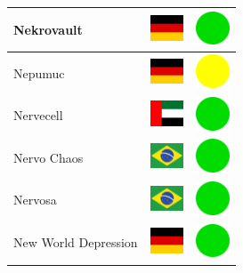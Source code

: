 \documentclass[12pt, a4paper, twoside]{report}
\begin{document}
\begin{center}
\begin{longtable}{|p{5cm}|p{2cm}|p{2cm}|}
 Nekrovault                                                 & \includegraphics[width=1cm]{../4x3/de} &   \includegraphics[width=1cm]{../likes/y} \\ \hline
 Nepumuc                                                    & \includegraphics[width=1cm]{../4x3/de} &   \includegraphics[width=1cm]{../likes/m} \\ \hline
 Nervecell                                                  & \includegraphics[width=1cm]{../4x3/ae} &   \includegraphics[width=1cm]{../likes/y} \\ \hline
 Nervo Chaos                                                & \includegraphics[width=1cm]{../4x3/br} &   \includegraphics[width=1cm]{../likes/y} \\ \hline
 Nervosa                                                    & \includegraphics[width=1cm]{../4x3/br} &   \includegraphics[width=1cm]{../likes/y} \\ \hline
 New World Depression                                       & \includegraphics[width=1cm]{../4x3/de} &   \includegraphics[width=1cm]{../likes/y} \\ \hline

\end{longtable}
\end{center}
\end{document}

